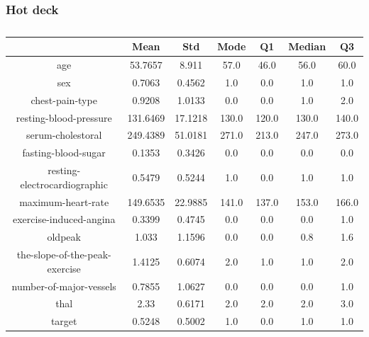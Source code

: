 \documentclass{classrep}
\begin{document}
{{            \subsubsection{Hot deck}
            \label{results:15-percent:dot-deck} {
                \begin{table}[!htbp]
                    \centering
                    \begin{tabular}{|c|c|c|c|c|c|c|}
                        \hline
                        & Mean & Std & Mode & Q1 & Median & Q3 \\ \hline
                        age & 53.7657 & 8.911 & 57.0 & 46.0 & 56.0 & 60.0 \\ \hline
                        sex & 0.7063 & 0.4562 & 1.0 & 0.0 & 1.0 & 1.0 \\ \hline
                        chest-pain-type & 0.9208 & 1.0133 & 0.0 & 0.0 & 1.0 & 2.0 \\ \hline
                        resting-blood-pressure & 131.6469 & 17.1218 & 130.0 & 120.0 & 130.0 & 140.0 \\ \hline
                        serum-cholestoral & 249.4389 & 51.0181 & 271.0 & 213.0 & 247.0 & 273.0 \\ \hline
                        fasting-blood-sugar & 0.1353 & 0.3426 & 0.0 & 0.0 & 0.0 & 0.0 \\ \hline
                        resting-electrocardiographic & 0.5479 & 0.5244 & 1.0 & 0.0 & 1.0 & 1.0 \\ \hline
                        maximum-heart-rate & 149.6535 & 22.9885 & 141.0 & 137.0 & 153.0 & 166.0 \\ \hline
                        exercise-induced-angina & 0.3399 & 0.4745 & 0.0 & 0.0 & 0.0 & 1.0 \\ \hline
                        oldpeak & 1.033 & 1.1596 & 0.0 & 0.0 & 0.8 & 1.6 \\ \hline
                        the-slope-of-the-peak-exercise & 1.4125 & 0.6074 & 2.0 & 1.0 & 1.0 & 2.0 \\ \hline
                        number-of-major-vessels & 0.7855 & 1.0627 & 0.0 & 0.0 & 0.0 & 1.0 \\ \hline
                        thal & 2.33 & 0.6171 & 2.0 & 2.0 & 2.0 & 3.0 \\ \hline
                        target & 0.5248 & 0.5002 & 1.0 & 0.0 & 1.0 & 1.0 \\ \hline
                    \end{tabular}
                    \caption{}
                    \label{result_15_Hot-deck}
                \end{table}
                \FloatBarrier

}}}
\end{document}
